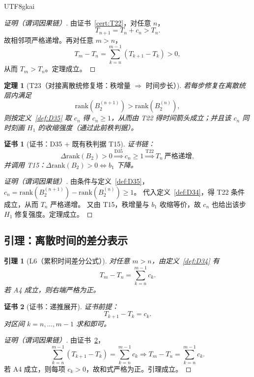 \documentclass[12pt]{article}
\newtheorem{theorem}{定理}[section]
\newtheorem{lemma}{引理}[section]
\newtheorem{Certificate}{证书}[section]
\begin{document}
\begin{CJK*}{UTF8}{gkai}
\begin{proof}[证明（谓词因果链）]
由证书~\ref{cert:T22}，对任意 $n$，
\[
T_{n+1}=T_n+c_n>T_n.
\]
故相邻项严格递增。再对任意 $m>n$，
\[
T_m-T_n=\sum_{k=n}^{m-1}(T_{k+1}-T_k)>0,
\]
从而 $T_m>T_n$。定理成立。
\end{proof}

\begin{theorem}[T23（对接离散统修复塔：秩增量 $\Rightarrow$ 时间步长）]
\label{thm:T23}
若每步修复在离散统层内满足
\[
\mathrm{rank}(B_2^{(n+1)})>\mathrm{rank}(B_2^{(n)}),
\]
则按定义~\ref{def:D35} 取 $c_n$ 得 $c_n\ge 1$，从而由 T22 得时间箭头成立；并且该 $c_n$ 同时刻画 $H_1$ 的收缩强度（通过此前秩判据）。
\end{theorem}

\begin{Certificate}[证书：D35 + 既有秩判据 T15]
\label{cert:T23}
证书链：
\[
\Delta\mathrm{rank}(B_2)>0
\overset{\text{D35}}{\Longrightarrow}
c_n\ge 1
\overset{\text{T22}}{\Longrightarrow}
T_n\ \text{严格递增},
\]
并调用 T15：$\Delta\mathrm{rank}(B_2)>0\Leftrightarrow b_1$ 下降。
\end{Certificate}

\begin{proof}[证明（谓词因果链）]
由条件与定义~\ref{def:D35}，$c_n=\mathrm{rank}(B_2^{(n+1)})-\mathrm{rank}(B_2^{(n)})\ge 1$。
代入定义~\ref{def:D34}，得 T22 条件成立，从而 $T_n$ 严格递增。
又由 T15，秩增量与 $b_1$ 收缩等价，故 $c_n$ 也给出该步 $H_1$ 修复强度。定理成立。
\end{proof}

\subsection{引理：离散时间的差分表示}

\begin{lemma}[L6（累积时间差分公式）]
\label{lem:L6}
对任意 $m>n$，由定义~\ref{def:D34} 有
\[
T_m-T_n=\sum_{k=n}^{m-1}c_k.
\]
若 A4 成立，则右端严格为正。
\end{lemma}

\begin{Certificate}[证书：递推展开]
\label{cert:L6}
证书前提：
\[
T_{k+1}-T_k=c_k.
\]
对区间 $k=n,\dots,m-1$ 求和即可。
\end{Certificate}

\begin{proof}[证明（谓词因果链）]
由证书~\ref{cert:L6}，
\[
\sum_{k=n}^{m-1}(T_{k+1}-T_k)=\sum_{k=n}^{m-1}c_k
\Rightarrow
T_m-T_n=\sum_{k=n}^{m-1}c_k.
\]
若 A4 成立，则每项 $c_k>0$，故和式严格为正。引理成立。
\end{proof}


\end{CJK*}
\end{document}
